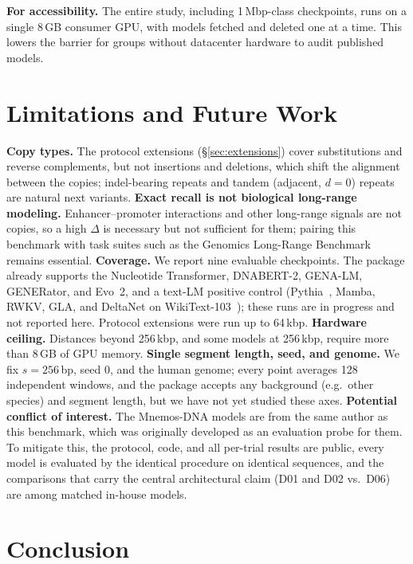 \textbf{For accessibility.} The entire study, including 1\,Mbp-class checkpoints, runs on a
single 8\,GB consumer GPU, with models fetched and deleted one at a time. This lowers the
barrier for groups without datacenter hardware to audit published models.

\section{Limitations and Future Work}
\label{sec:limitations}

\textbf{Copy types.} The protocol extensions (\S\ref{sec:extensions}) cover substitutions
and reverse complements, but not insertions and deletions, which shift the alignment between
the copies; indel-bearing repeats and tandem (adjacent, $d=0$) repeats are natural next
variants. \textbf{Exact recall is not biological long-range modeling.} Enhancer--promoter
interactions and other long-range signals are not copies, so a high $\Delta$ is necessary but
not sufficient for them; pairing this benchmark with task suites such as the Genomics
Long-Range Benchmark~\cite{trop2024lrb} remains essential. \textbf{Coverage.} We report nine
evaluable checkpoints. The package already supports the Nucleotide Transformer, DNABERT-2,
GENA-LM, GENERator, and Evo~2, and a text-LM positive control
(Pythia~\cite{biderman2023pythia}, Mamba, RWKV, GLA, and DeltaNet on
WikiText-103~\cite{merity2017wikitext}); these runs are in progress and not reported here.
Protocol extensions were run up to 64\,kbp. \textbf{Hardware ceiling.} Distances beyond
256\,kbp, and some models at 256\,kbp, require more than 8\,GB of GPU memory.
\textbf{Single segment length, seed, and genome.} We fix $s=256$\,bp, seed 0, and the human
genome; every point averages 128 independent windows, and the package accepts any
background (e.g.\ other species) and segment length, but we have not yet studied these axes.
\textbf{Potential conflict
of interest.} The Mnemos-DNA models are from the same author as this benchmark, which was
originally developed as an evaluation probe for them. To mitigate this, the protocol, code,
and all per-trial results are public, every model is evaluated by the identical procedure on
identical sequences, and the comparisons that carry the central architectural claim (D01 and
D02 vs.\ D06) are among matched in-house models.

\section{Conclusion}

